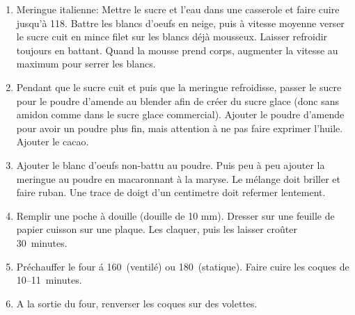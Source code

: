 

\begin{ingredients}
\end{ingredients}


\begin{recipe}
  \begin{enumerate}

  \item Meringue italienne:  Mettre le sucre et l'eau dans
    une casserole et faire cuire jusqu'\`a 118\degreeC.  Battre les blancs d'oeufs
    en neige, puis \`a vitesse moyenne verser le sucre cuit en mince filet
    sur les blancs d\'ej\`a mousseux.  Laisser refroidir toujours en
    battant.  Quand la mousse prend corps, augmenter la vitesse au
    maximum pour serrer les blancs.

  \item Pendant que le sucre cuit et puis que la meringue refroidisse,
    passer le sucre pour le poudre d'amende au blender afin de cr\'eer
    du sucre glace (donc sans amidon comme dans le sucre glace
    commercial).  Ajouter le poudre d'amende pour avoir un poudre plus
    fin, mais attention \`a ne pas faire exprimer l'huile.  Ajouter le cacao.

  \item Ajouter le blanc d'oeufs non-battu au poudre.  Puis peu \`a
    peu ajouter la meringue au poudre en macaronnant \`a la maryse.
    Le m\'elange doit briller et faire ruban.  Une trace de doigt d'un
    centimetre doit refermer lentement.

  \item Remplir une poche \`a douille (douille de 10 mm).  Dresser sur
    une feuille de papier cuisson sur une plaque.  Les claquer, puis
    les laisser cro\^uter 30~minutes.

  \item Pr\'echauffer le four \'a 160\degreeC\ (ventil\'e) ou 180\degreeC\
    (statique).  Faire cuire les coques de 10--11~minutes.

  \item A la sortie du four, renverser les coques sur des volettes.

  \end{enumerate}
\end{recipe}


